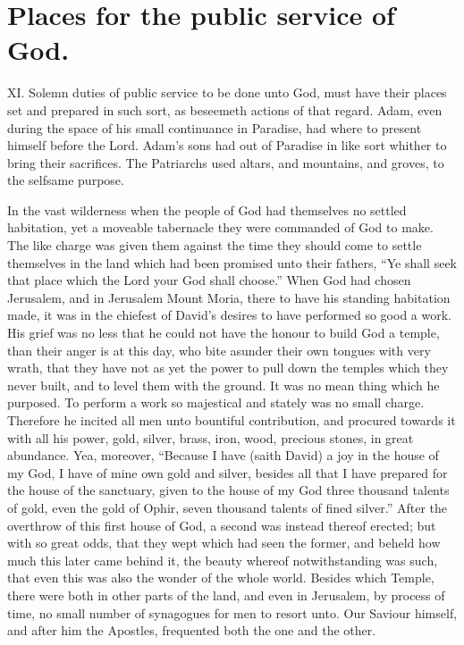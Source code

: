 \section*{Places for the public service of God.}
XI. Solemn duties of public service to be done unto God, must have their places set and prepared in such sort, as beseemeth actions of that regard. Adam, even during the space of his small continuance in Paradise, had where to present himself before the Lord. Adam’s sons had out of Paradise in like sort whither to bring their sacrifices. The Patriarchs used altars, and mountains, and groves, to the selfsame purpose.

In the vast wilderness when the people of God had themselves no settled habitation, yet a moveable tabernacle they were commanded of God to make. The like charge was given them against the time they should come to settle themselves in the land which had been promised unto their fathers, “Ye shall seek that place which the Lord your God shall choose.” When God had chosen Jerusalem, and in Jerusalem Mount Moria, there to have his standing habitation made, it was in the chiefest of David’s desires to have performed so good a work. His grief was no less that he could not have the honour to build God a temple, than their anger is at this day, who bite asunder their own tongues with very wrath, that they have not as yet the power to pull down the temples which they never built, and to level them with the ground. It was no mean thing which he purposed. To perform a work so majestical and stately was no small charge. Therefore he incited all men unto bountiful contribution, and procured towards it with all his power, gold, silver, brass, iron, wood, precious stones, in great abundance. Yea, moreover, “Because I have (saith David) a joy in the house of my God, I have of mine own gold and silver, besides all that I have prepared for the house of the sanctuary, given to the house of my God three thousand talents of gold, even the gold of Ophir, seven thousand talents of fined silver.” After the overthrow of this first house of God, a second was instead thereof erected; but with so great odds, that they wept which had seen the former, and beheld  how much this later came behind it, the beauty whereof notwithstanding was such, that even this was also the wonder of the whole world.
 Besides which Temple, there were both in other parts of the land, and even in Jerusalem, by process of time, no small number of synagogues for men to resort unto. Our Saviour himself, and after him the Apostles, frequented both the one and the other.

